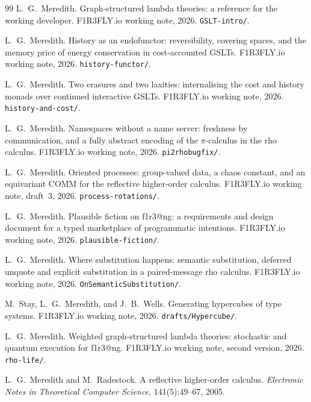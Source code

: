 \documentclass[11pt]{article}
\makeatletter
\theoremstyle{definition}
\theoremstyle{plain}
\theoremstyle{remark}
\newcommand{\flang}{\textsf{f1r3\textbar @ng}}
\makeatother
\begin{document}
\begin{thebibliography}{99}
L.~G.~Meredith.
\newblock Graph-structured lambda theories: a reference for the working
developer.
\newblock F1R3FLY.io working note, 2026. \texttt{GSLT-intro/}.

L.~G.~Meredith.
\newblock History as an endofunctor: reversibility, covering spaces, and the
memory price of energy conservation in cost-accounted GSLTs.
\newblock F1R3FLY.io working note, 2026. \texttt{history-functor/}.

L.~G.~Meredith.
\newblock Two erasures and two laxities: internalising the cost and history
monads over continued interactive GSLTs.
\newblock F1R3FLY.io working note, 2026. \texttt{history-and-cost/}.

L.~G.~Meredith.
\newblock Namespaces without a name server: freshness by communication, and a
fully abstract encoding of the \(\pi\)-calculus in the rho calculus.
\newblock F1R3FLY.io working note, 2026. \texttt{pi2rhobugfix/}.

L.~G.~Meredith.
\newblock Oriented processes: group-valued data, a chaos constant, and an
equivariant COMM for the reflective higher-order calculus.
\newblock F1R3FLY.io working note, draft~3, 2026. \texttt{process-rotations/}.

L.~G.~Meredith.
\newblock Plausible fiction on \flang{}: a requirements and design document for
a typed marketplace of programmatic intentions.
\newblock F1R3FLY.io working note, 2026. \texttt{plausible-fiction/}.

L.~G.~Meredith.
\newblock Where substitution happens: semantic substitution, deferred unquote
and explicit substitution in a paired-message rho calculus.
\newblock F1R3FLY.io working note, 2026. \texttt{OnSemanticSubstitution/}.

M.~Stay, L.~G.~Meredith, and J.~B.~Wells.
\newblock Generating hypercubes of type systems.
\newblock F1R3FLY.io working note, 2026. \texttt{drafts/Hypercube/}.

L.~G.~Meredith.
\newblock Weighted graph-structured lambda theories: stochastic and quantum
execution for \flang{}.
\newblock F1R3FLY.io working note, second version, 2026. \texttt{rho-life/}.

L.~G.~Meredith and M.~Radestock.
\newblock A reflective higher-order calculus.
\newblock \emph{Electronic Notes in Theoretical Computer Science},
141(5):49--67, 2005.


\end{thebibliography}
\end{document}
